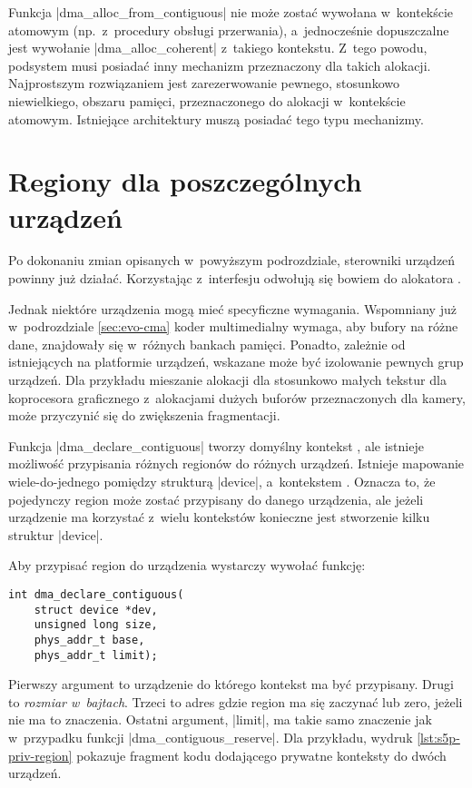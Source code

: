 Funkcja \code|dma_alloc_from_contiguous| nie może zostać wywołana
w~kontekście atomowym (np.\ z~procedury obsługi przerwania),
a~jednocześnie dopuszczalne jest wywołanie \code|dma_alloc_coherent|
z~takiego kontekstu.  Z~tego powodu, podsystem  musi posiadać inny
mechanizm przeznaczony dla takich alokacji.  Najprostszym rozwiązaniem
jest zarezerwowanie pewnego, stosunkowo niewielkiego, obszaru pamięci,
przeznaczonego do alokacji w~kontekście atomowym.  Istniejące
architektury muszą posiadać tego typu mechanizmy.


\section{Regiony  dla poszczególnych urządzeń}\label{sec:priv-regions}

Po dokonaniu zmian opisanych w~powyższym podrozdziale, sterowniki
urządzeń powinny już działać.  Korzystając z~interfesju  odwołują
się bowiem do alokatora .

Jednak niektóre urządzenia mogą mieć specyficzne wymagania.
Wspomniany już w~podrozdziale \ref{sec:evo-cma} koder multimedialny
wymaga, aby bufory na różne dane, znajdowały się w~różnych bankach
pamięci.  Ponadto, zależnie od istniejących na platformie urządzeń,
wskazane może być izolowanie pewnych grup urządzeń.  Dla przykładu
mieszanie alokacji dla stosunkowo małych tekstur dla koprocesora
graficznego z~alokacjami dużych buforów przeznaczonych dla kamery,
może przyczynić się do zwiększenia fragmentacji.

Funkcja \code|dma_declare_contiguous| tworzy domyślny kontekst ,
ale istnieje możliwość przypisania różnych regionów do różnych
urządzeń.  Istnieje mapowanie wiele-do-jednego pomiędzy strukturą
\code|device|, a~kontekstem .  Oznacza to, że pojedynczy region 
może zostać przypisany do danego urządzenia, ale jeżeli urządzenie ma
korzystać z~wielu kontekstów  konieczne jest stworzenie kilku
struktur \code|device|.

Aby przypisać region  do urządzenia wystarczy wywołać funkcję:

\begin{lstlisting}
int dma_declare_contiguous(
	struct device *dev,
	unsigned long size,
	phys_addr_t base,
	phys_addr_t limit);
\end{lstlisting}

Pierwszy argument to urządzenie do którego kontekst ma być przypisany.
Drugi to \emph{rozmiar w~bajtach}.  Trzeci to adres gdzie region ma
się zaczynać lub zero, jeżeli nie ma to znaczenia.  Ostatni argument,
\code|limit|, ma takie samo znaczenie jak w~przypadku funkcji
\code|dma_contiguous_reserve|.  Dla przykładu, wydruk
\ref{lst:s5p-priv-region} pokazuje fragment kodu dodającego prywatne
konteksty do dwóch urządzeń.

